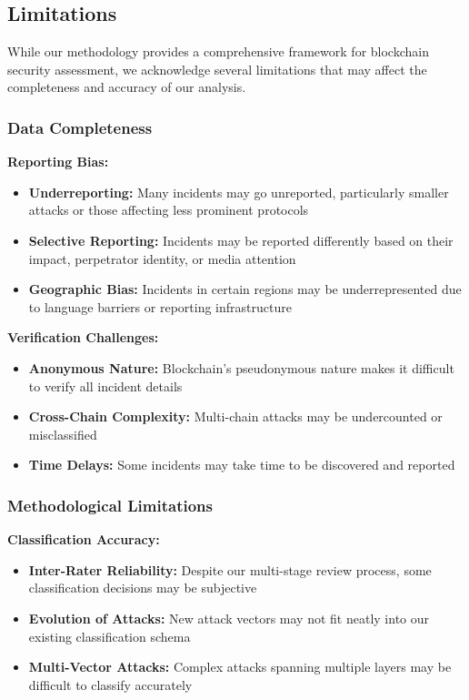 \subsection{Limitations}
\label{sec:limitations}

While our methodology provides a comprehensive framework for blockchain security assessment, we acknowledge several limitations that may affect the completeness and accuracy of our analysis.

\subsubsection{Data Completeness}
\textbf{Reporting Bias:}
\begin{itemize}
    \item \textbf{Underreporting:} Many incidents may go unreported, particularly smaller attacks or those affecting less prominent protocols
    \item \textbf{Selective Reporting:} Incidents may be reported differently based on their impact, perpetrator identity, or media attention
    \item \textbf{Geographic Bias:} Incidents in certain regions may be underrepresented due to language barriers or reporting infrastructure
\end{itemize}

\textbf{Verification Challenges:}
\begin{itemize}
    \item \textbf{Anonymous Nature:} Blockchain's pseudonymous nature makes it difficult to verify all incident details
    \item \textbf{Cross-Chain Complexity:} Multi-chain attacks may be undercounted or misclassified
    \item \textbf{Time Delays:} Some incidents may take time to be discovered and reported
\end{itemize}

\subsubsection{Methodological Limitations}
\textbf{Classification Accuracy:}
\begin{itemize}
    \item \textbf{Inter-Rater Reliability:} Despite our multi-stage review process, some classification decisions may be subjective
    \item \textbf{Evolution of Attacks:} New attack vectors may not fit neatly into our existing classification schema
    \item \textbf{Multi-Vector Attacks:} Complex attacks spanning multiple layers may be difficult to classify accurately
\end{itemize}

